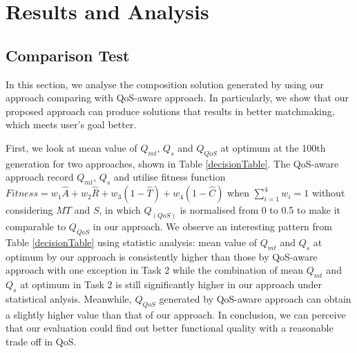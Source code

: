 \documentclass{llncs}
\begin{document}
\section{Results and Analysis}\label{results_analysis}
\vspace{-0.2cm}
\subsection{Comparison Test}\label{comparisonTest}
In this section, we analyse the composition solution generated by using our approach comparing with QoS-aware approach. In particularly, we show that our proposed approach can produce solutions that results in better matchmaking, which meets user's goal better.
 
First, we look at mean value of $Q_{mt}$, $Q_{s}$ and $Q_{QoS}$ at optimum at the 100th generation for two approaches, shown in Table \ref{decisionTable}. The QoS-aware approach record $Q_{mt}$, $Q_{s}$ and utilise fitness function $Fitness = w_1 \hat{A} + w_2 \hat{R} + w_3(1 - \hat{T}) + w_4(1 - \hat{C})$ when $\sum_{i=1}^{4} w_i = 1$ without considering $MT$ and $S$, in which $Q_(QoS)$ is normalised from 0 to 0.5 to make it comparable to $Q_{QoS}$ in our approach. We observe an interesting pattern from Table \ref{decisionTable} using statistic analysis: mean value of $Q_{mt}$ and $Q_{s}$ at optimum by our approach is consistently higher than those by QoS-aware approach with one exception in Task 2 while the combination of mean $Q_{mt}$ and $Q_{s}$ at optimum in Task 2 is still significantly higher in our approach under statistical anlysis. Meanwhile, $Q_{QoS}$ generated by QoS-aware approach can obtain a slightly higher value than that of our approach. In conclusion, we can perceive that our evaluation could find out better functional quality with a reasonable trade off in QoS.
\vspace{-0.5cm}
\end{document}
